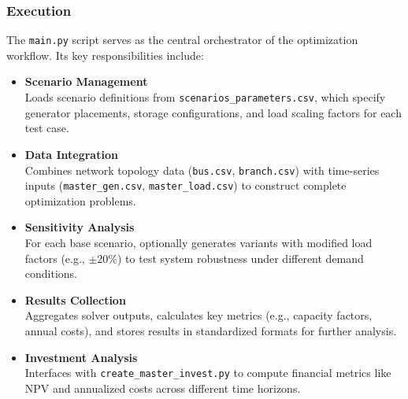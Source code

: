 





\subsubsection{Execution}
\label{sec:execution}
The \texttt{main.py} script serves as the central orchestrator of the optimization workflow.
Its key responsibilities include:

\begin{itemize}
    \item \textbf{Scenario Management}\\
    Loads scenario definitions from \texttt{scenarios\_parameters.csv}, which specify generator placements, storage 
    configurations, and load scaling factors for each test case.
    
    \item \textbf{Data Integration}\\
    Combines network topology data (\texttt{bus.csv}, \texttt{branch.csv}) with time-series inputs 
    (\texttt{master\_gen.csv}, \texttt{master\_load.csv}) to construct complete optimization problems.
    
    \item \textbf{Sensitivity Analysis}\\
    For each base scenario, optionally generates variants with modified load factors (e.g., $\pm20\%$) to test 
    system robustness under different demand conditions.
    
    \item \textbf{Results Collection}\\
    Aggregates solver outputs, calculates key metrics (e.g., capacity factors, annual costs), and stores results 
    in standardized formats for further analysis.
    
    \item \textbf{Investment Analysis}\\
    Interfaces with \texttt{create\_master\_invest.py} to compute financial metrics like NPV and annualized costs 
    across different time horizons.
\end{itemize}

